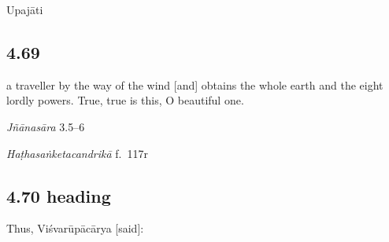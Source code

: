 \begin{ekdosis}

\begin{metre}[hp04_068]
Upajāti
\end{metre}

\subsection*{4.69}
\begin{translation} a traveller by the way of the wind [and] obtains the whole earth and the eight lordly powers. True, true is this, O beautiful one.
\end{translation}

\begin{sources}[hp04_069]
\emph{Jñānasāra} 3.5–6
\begin{versinnote}
\end{versinnote}
\end{sources}

\begin{testimonia}[hp04_069]
\emph{Haṭhasaṅketacandrikā} f.~117r
\begin{versinnote}
\end{versinnote}
\end{testimonia}


\subsection*{4.70 heading}
\begin{translation}[hp04_070a]
Thus, Viśvarūpācārya [said]:
\end{translation}


\end{ekdosis}
